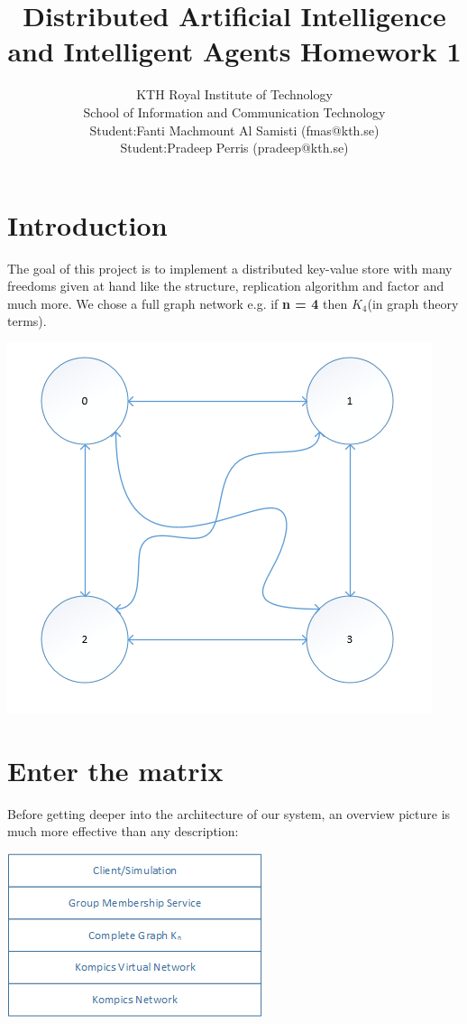 \documentclass[a4paper, 11pt]{article}
\title{\textbf{Distributed Artificial Intelligence and Intelligent Agents Homework 1}}
\author{KTH Royal Institute of Technology \\ 
		School of Information and Communication Technology \\
		Student:Fanti Machmount Al Samisti (fmas@kth.se) \\
		Student:Pradeep Perris (pradeep@kth.se)}
\begin{document}
	
\maketitle

\section{Introduction}

\noindent The goal of this project is to implement a distributed key-value store with many freedoms given at hand like the structure, replication algorithm and factor and much more. We chose a full graph network e.g. if \textbf{n = 4} then $K_4$(in graph theory terms). 

{\centering\includegraphics[scale = 0.9]{./figures/network-overview.png}\par}

\section{Enter the matrix}

\noindent Before getting deeper into the architecture of our system, an overview picture is much more effective than any description:

{\centering\includegraphics[scale = 0.9]{./figures/architecture.png}\par}
\end{document}
